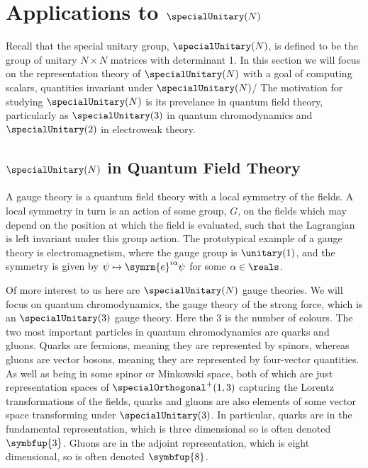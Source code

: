 \documentclass[fleqn]{NotesClass}
\newcommand{\e}{\symrm{e}}
\newcommand{\rep}[1]{\symbfup{#1}}
\begin{document}
    \chapter{Applications to \texorpdfstring{\(\specialUnitary(N)\)}{SU(N)}}
    Recall that the special unitary group, \(\specialUnitary(N)\), is defined to be the group of unitary \(N \times N\) matrices with determinant 1.
    In this section we will focus on the representation theory of \(\specialUnitary(N)\) with a goal of computing scalars, quantities invariant under \(\specialUnitary(N)\)/
    The motivation for studying \(\specialUnitary(N)\) is its prevelance in quantum field theory, particularly as \(\specialUnitary(3)\) in quantum chromodynamics and \(\specialUnitary(2)\) in electroweak theory.
    
    \section{\texorpdfstring{\(\specialUnitary(N)\)}{SU(N)} in Quantum Field Theory}
    A gauge theory is a quantum field theory with a local symmetry of the fields.
    A local symmetry in turn is an action of some group, \(G\), on the fields which may depend on the position at which the field is evaluated, such that the Lagrangian is left invariant under this group action.
    The prototypical example of a gauge theory is electromagnetism, where the gauge group is \(\unitary(1)\), and the symmetry is given by \(\psi \mapsto \e^{i\alpha}\psi\) for some \(\alpha \in \reals\).
    
    Of more interest to us here are \(\specialUnitary(N)\) gauge theories.
    We will focus on quantum chromodynamics, the gauge theory of the strong force, which is an \(\specialUnitary(3)\) gauge theory.
    Here the 3 is the number of colours.
    The two most important particles in quantum chromodynamics are quarks and gluons.
    Quarks are fermions, meaning they are represented by spinors, whereas gluons are vector bosons, meaning they are represented by four-vector quantities.
    As well as being in some spinor or Minkowski space, both of which are just representation spaces of \(\specialOrthogonal^+(1, 3)\) capturing the Lorentz transformations of the fields, quarks and gluons are also elements of some vector space transforming under \(\specialUnitary(3)\).
    In particular, quarks are in the fundamental representation, which is three dimensional so is often denoted \(\rep{3}\).
    Gluons are in the adjoint representation, which is eight dimensional, so is often denoted \(\rep{8}\).
    
\end{document}
